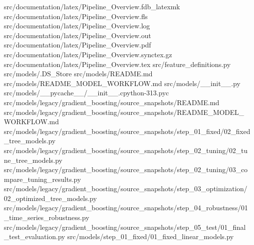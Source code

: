 \documentclass[
  11pt,
  a4paper]{article}
\newenvironment{Shaded}{}{}
\newcommand{\NormalTok}[1]{#1}
\begin{document}
\begin{Shaded}
\begin{Highlighting}[]
\NormalTok{src/documentation/latex/Pipeline\_\allowbreak{}Overview.fdb\_\allowbreak{}latexmk}
\NormalTok{src/documentation/latex/Pipeline\_\allowbreak{}Overview.fls}
\NormalTok{src/documentation/latex/Pipeline\_\allowbreak{}Overview.log}
\NormalTok{src/documentation/latex/Pipeline\_\allowbreak{}Overview.out}
\NormalTok{src/documentation/latex/Pipeline\_\allowbreak{}Overview.pdf}
\NormalTok{src/documentation/latex/Pipeline\_\allowbreak{}Overview.synctex.gz}
\NormalTok{src/documentation/latex/Pipeline\_\allowbreak{}Overview.tex}
\NormalTok{src/feature\_\allowbreak{}definitions.py}
\NormalTok{src/models/.DS\_\allowbreak{}Store}
\NormalTok{src/models/README.md}
\NormalTok{src/models/README\_\allowbreak{}MODEL\_\allowbreak{}WORKFLOW.md}
\NormalTok{src/models/\_\allowbreak{}\_\allowbreak{}init\_\allowbreak{}\_\allowbreak{}.py}
\NormalTok{src/models/\_\allowbreak{}\_\allowbreak{}pycache\_\allowbreak{}\_\allowbreak{}/\_\allowbreak{}\_\allowbreak{}init\_\allowbreak{}\_\allowbreak{}.cpython{-}313.pyc}
\NormalTok{src/models/legacy/gradient\_\allowbreak{}boosting/source\_\allowbreak{}snapshots/README.md}
\NormalTok{src/models/legacy/gradient\_\allowbreak{}boosting/source\_\allowbreak{}snapshots/README\_\allowbreak{}MODEL\_\allowbreak{}WORKFLOW.md}
\NormalTok{src/models/legacy/gradient\_\allowbreak{}boosting/source\_\allowbreak{}snapshots/step\_\allowbreak{}01\_\allowbreak{}fixed/02\_\allowbreak{}fixed\_\allowbreak{}tree\_\allowbreak{}models.py}
\NormalTok{src/models/legacy/gradient\_\allowbreak{}boosting/source\_\allowbreak{}snapshots/step\_\allowbreak{}02\_\allowbreak{}tuning/02\_\allowbreak{}tune\_\allowbreak{}tree\_\allowbreak{}models.py}
\NormalTok{src/models/legacy/gradient\_\allowbreak{}boosting/source\_\allowbreak{}snapshots/step\_\allowbreak{}02\_\allowbreak{}tuning/03\_\allowbreak{}compare\_\allowbreak{}tuning\_\allowbreak{}results.py}
\NormalTok{src/models/legacy/gradient\_\allowbreak{}boosting/source\_\allowbreak{}snapshots/step\_\allowbreak{}03\_\allowbreak{}optimization/02\_\allowbreak{}optimized\_\allowbreak{}tree\_\allowbreak{}models.py}
\NormalTok{src/models/legacy/gradient\_\allowbreak{}boosting/source\_\allowbreak{}snapshots/step\_\allowbreak{}04\_\allowbreak{}robustness/01\_\allowbreak{}time\_\allowbreak{}series\_\allowbreak{}robustness.py}
\NormalTok{src/models/legacy/gradient\_\allowbreak{}boosting/source\_\allowbreak{}snapshots/step\_\allowbreak{}05\_\allowbreak{}test/01\_\allowbreak{}final\_\allowbreak{}test\_\allowbreak{}evaluation.py}
\NormalTok{src/models/step\_\allowbreak{}01\_\allowbreak{}fixed/01\_\allowbreak{}fixed\_\allowbreak{}linear\_\allowbreak{}models.py}

\end{Highlighting}
\end{Shaded}
\end{document}
